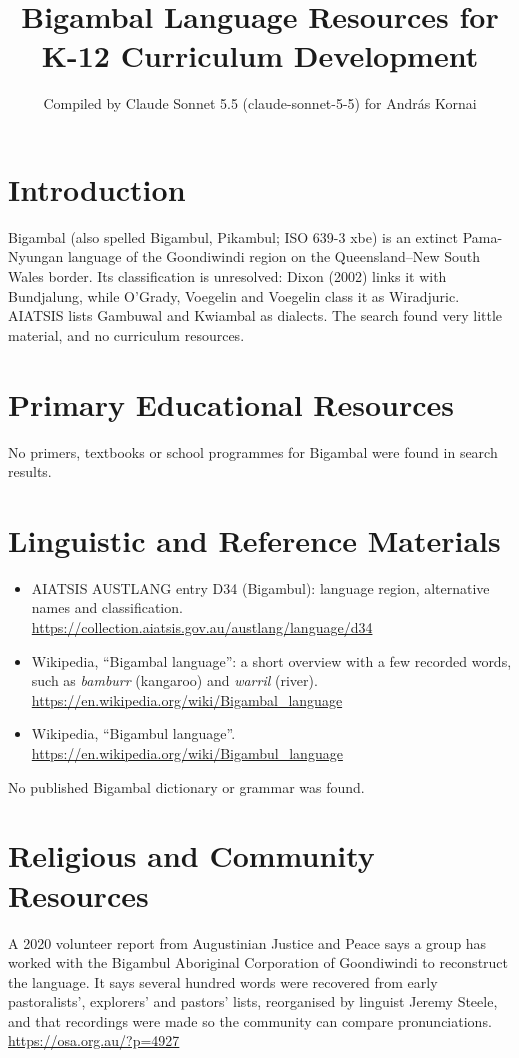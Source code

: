 \documentclass[12pt]{article}
\title{Bigambal Language Resources for K-12 Curriculum Development}
\author{Compiled by Claude Sonnet 5.5 (claude-sonnet-5-5) for Andr\'as Kornai}
\date{}
\begin{document}
\maketitle

\section{Introduction}
Bigambal (also spelled Bigambul, Pikambul; ISO 639-3 xbe) is an extinct Pama-Nyungan language of the Goondiwindi region on the Queensland--New South Wales border. Its classification is unresolved: Dixon (2002) links it with Bundjalung, while O'Grady, Voegelin and Voegelin class it as Wiradjuric. AIATSIS lists Gambuwal and Kwiambal as dialects. The search found very little material, and no curriculum resources.

\section{Primary Educational Resources}
No primers, textbooks or school programmes for Bigambal were found in search results.

\section{Linguistic and Reference Materials}
\begin{itemize}
\item AIATSIS AUSTLANG entry D34 (Bigambul): language region, alternative names and classification. \url{https://collection.aiatsis.gov.au/austlang/language/d34}
\item Wikipedia, ``Bigambal language'': a short overview with a few recorded words, such as \emph{bamburr} (kangaroo) and \emph{warril} (river). \url{https://en.wikipedia.org/wiki/Bigambal_language}
\item Wikipedia, ``Bigambul language''. \url{https://en.wikipedia.org/wiki/Bigambul_language}
\end{itemize}
No published Bigambal dictionary or grammar was found.

\section{Religious and Community Resources}
A 2020 volunteer report from Augustinian Justice and Peace says a group has worked with the Bigambul Aboriginal Corporation of Goondiwindi to reconstruct the language. It says several hundred words were recovered from early pastoralists', explorers' and pastors' lists, reorganised by linguist Jeremy Steele, and that recordings were made so the community can compare pronunciations. \url{https://osa.org.au/?p=4927}
\end{document}
